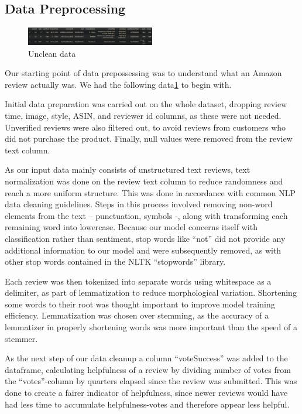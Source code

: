 \documentclass[twoside,twocolumn]{article}
\begin{document}
\subsection{Data Preprocessing}

\begin{figure}[h]
	\centering
	\includegraphics[width=0.5\textwidth]{img/unclean_data.pdf}
	\caption{Unclean data}
	\label{fig:unclean_data}
\end{figure}

Our starting point of data prepossessing was to understand what an Amazon review actually was. We had the following data\ref{fig:unclean_data} to begin with.

Initial data preparation was carried out on the whole dataset, dropping review time, image, style, ASIN, and reviewer id columns, as these were not needed. Unverified reviews were also filtered out, to avoid reviews from customers who did not purchase the product. Finally, null values were removed from the review text column.

As our input data mainly consists of unstructured text reviews, text normalization was done on the review text column to reduce randomness and reach a more uniform structure. This was done in accordance with common NLP data cleaning guidelines. Steps in this process involved removing non-word elements from the text – punctuation, symbols -, along with transforming each remaining word into lowercase. Because our model concerns itself with classification rather than sentiment, stop words like “not” did not provide any additional information to our model and were subsequently removed, as with other stop words contained in the NLTK “stopwords” library.

Each review was then tokenized into separate words using whitespace as a delimiter, as part of lemmatization to reduce morphological variation. Shortening some words to their root was thought important to improve model training efficiency. Lemmatization was chosen over stemming, as the accuracy of a lemmatizer in properly shortening words was more important than the speed of a stemmer.

As the next step of our data cleanup a column “voteSuccess” was added to the dataframe, calculating helpfulness of a review by dividing number of votes from the “votes”-column by quarters elapsed since the review was submitted. This was done to create a fairer indicator of helpfulness, since newer reviews would have had less time to accumulate helpfulness-votes and therefore appear less helpful.
\end{document}
